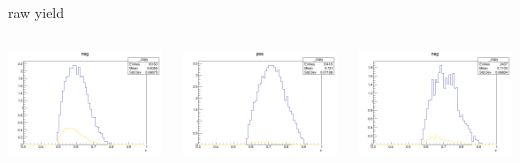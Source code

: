 \begin{frame}{raw yield}
\begin{columns}
\begin{column}[T]{0.25\textwidth}
\includegraphics[width = \textwidth]{results/yield/statistics/yield_x_Q2_z_0.65_5.500_0.60_neg.png}
\end{column}
\begin{column}[T]{0.25\textwidth}
\includegraphics[width = \textwidth]{results/yield/statistics/yield_x_Q2_z_0.65_5.500_0.70_pos.png}
\end{column}
\begin{column}[T]{0.25\textwidth}
\includegraphics[width = \textwidth]{results/yield/statistics/yield_x_Q2_z_0.65_5.500_0.70_neg.png}
\end{column}
\end{columns}
\end{frame}
